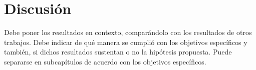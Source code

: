 \setcounter{figure}{0} %
\renewcommand{\thefigure}{\thesection.\arabic{figure}}
\section{\Large Discusión}
Debe poner los resultados en contexto, comparándolo con los resultados de otros trabajos. Debe indicar de qué manera se cumplió con los objetivos específicos y también, si dichos resultados sustentan o no la hipótesis propuesta. Puede separarse en subcapítulos de acuerdo con los objetivos específicos.